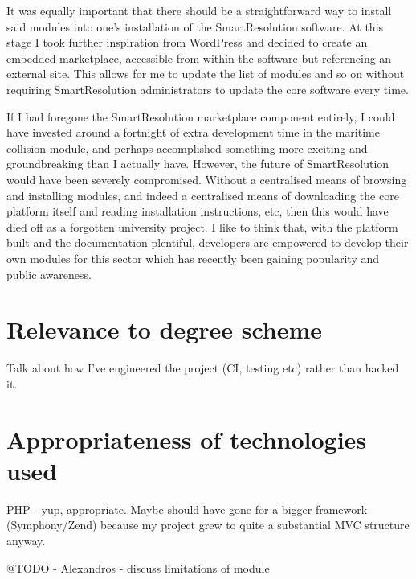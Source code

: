 It was equally important that there should be a straightforward way to install said modules into one's installation of the SmartResolution software. At this stage I took further inspiration from WordPress and decided to create an embedded marketplace, accessible from within the software but referencing an external site. This allows for me to update the list of modules and so on without requiring SmartResolution administrators to update the core software every time.

If I had foregone the SmartResolution marketplace component entirely, I could have invested around a fortnight of extra development time in the maritime collision module, and perhaps accomplished something more exciting and groundbreaking than I actually have. However, the future of SmartResolution would have been severely compromised. Without a centralised means of browsing and installing modules, and indeed a centralised means of downloading the core platform itself and reading installation instructions, etc, then this would have died off as a forgotten university project. I like to think that, with the platform built and the documentation plentiful, developers are empowered to develop their own modules for this sector which has recently been gaining popularity and public awareness.

\section{Relevance to degree scheme}

Talk about how I've engineered the project (CI, testing etc) rather than hacked it.

\section{Appropriateness of technologies used}

PHP - yup, appropriate. Maybe should have gone for a bigger framework (Symphony/Zend) because my project grew to quite a substantial MVC structure anyway.

@TODO - Alexandros - discuss limitations of module